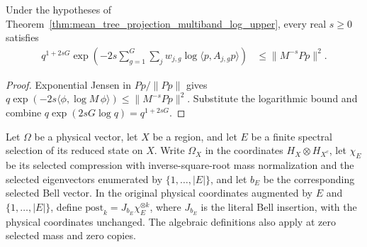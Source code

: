 \begin{theorem}
    \label{thm:mean_tree_projection_multiband_inverse_upper}
    \leanok
    Under the hypotheses of
    Theorem~\ref{thm:mean_tree_projection_multiband_log_upper}, every real
    $s\geq0$ satisfies
    \begin{align}
        q^{1+2sG}\exp\left(-2s\sum_{g=1}^G\sum_jw_{j,g}
            \log\langle p,A_{j,g}p\rangle\right)
        &\leq\|M^{-s}Pp\|^2.
    \end{align}
\end{theorem}
\begin{proof}
    \leanok
    Exponential Jensen in $Pp/\|Pp\|$ gives
    $q\exp(-2s\langle\phi,\log M\,\phi\rangle)
        \leq\|M^{-s}Pp\|^2$.
    Substitute the logarithmic bound and combine
    $q\exp(2sG\log q)=q^{1+2sG}$.
\end{proof}

\begin{definition}
    \label{def:selected_bell_postvector}
    \leanok
    Let $\Omega$ be a physical vector, let $X$ be a region, and let $E$
    be a finite spectral selection of its reduced state on $X$.
    Write $\Omega_X$ in the coordinates $H_X\otimes H_{X^c}$, let
    $\chi_E$ be its selected compression with inverse-square-root mass
    normalization and the selected
    eigenvectors enumerated by $\{1,\ldots,|E|\}$, and let $b_E$ be
    the corresponding selected Bell vector. In the original physical
    coordinates augmented by $E$ and $\{1,\ldots,|E|\}$, define
    $\mathrm{post}_k=J_{b_E}\chi_E^{\otimes k}$, where $J_{b_E}$ is
    the literal Bell insertion, with the physical coordinates unchanged.
    The algebraic definitions also apply at zero selected mass and zero copies.
\end{definition}

